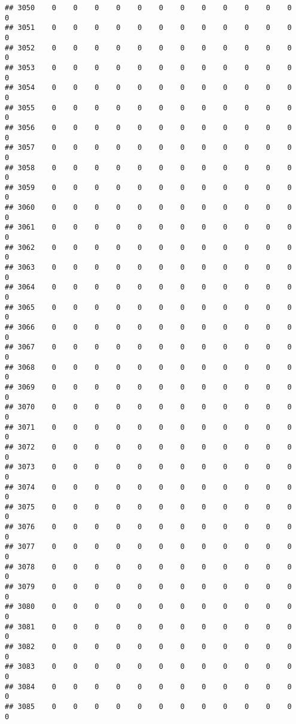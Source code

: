 \documentclass[]{article}
\begin{document}
\begin{verbatim}
## 3050    0    0    0    0    0    0    0    0    0    0    0    0    0
## 3051    0    0    0    0    0    0    0    0    0    0    0    0    0
## 3052    0    0    0    0    0    0    0    0    0    0    0    0    0
## 3053    0    0    0    0    0    0    0    0    0    0    0    0    0
## 3054    0    0    0    0    0    0    0    0    0    0    0    0    0
## 3055    0    0    0    0    0    0    0    0    0    0    0    0    0
## 3056    0    0    0    0    0    0    0    0    0    0    0    0    0
## 3057    0    0    0    0    0    0    0    0    0    0    0    0    0
## 3058    0    0    0    0    0    0    0    0    0    0    0    0    0
## 3059    0    0    0    0    0    0    0    0    0    0    0    0    0
## 3060    0    0    0    0    0    0    0    0    0    0    0    0    0
## 3061    0    0    0    0    0    0    0    0    0    0    0    0    0
## 3062    0    0    0    0    0    0    0    0    0    0    0    0    0
## 3063    0    0    0    0    0    0    0    0    0    0    0    0    0
## 3064    0    0    0    0    0    0    0    0    0    0    0    0    0
## 3065    0    0    0    0    0    0    0    0    0    0    0    0    0
## 3066    0    0    0    0    0    0    0    0    0    0    0    0    0
## 3067    0    0    0    0    0    0    0    0    0    0    0    0    0
## 3068    0    0    0    0    0    0    0    0    0    0    0    0    0
## 3069    0    0    0    0    0    0    0    0    0    0    0    0    0
## 3070    0    0    0    0    0    0    0    0    0    0    0    0    0
## 3071    0    0    0    0    0    0    0    0    0    0    0    0    0
## 3072    0    0    0    0    0    0    0    0    0    0    0    0    0
## 3073    0    0    0    0    0    0    0    0    0    0    0    0    0
## 3074    0    0    0    0    0    0    0    0    0    0    0    0    0
## 3075    0    0    0    0    0    0    0    0    0    0    0    0    0
## 3076    0    0    0    0    0    0    0    0    0    0    0    0    0
## 3077    0    0    0    0    0    0    0    0    0    0    0    0    0
## 3078    0    0    0    0    0    0    0    0    0    0    0    0    0
## 3079    0    0    0    0    0    0    0    0    0    0    0    0    0
## 3080    0    0    0    0    0    0    0    0    0    0    0    0    0
## 3081    0    0    0    0    0    0    0    0    0    0    0    0    0
## 3082    0    0    0    0    0    0    0    0    0    0    0    0    0
## 3083    0    0    0    0    0    0    0    0    0    0    0    0    0
## 3084    0    0    0    0    0    0    0    0    0    0    0    0    0
## 3085    0    0    0    0    0    0    0    0    0    0    0    0    0

\end{verbatim}
\end{document}
